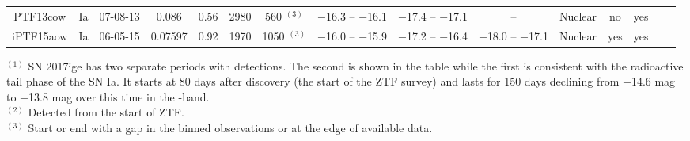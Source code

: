 \documentclass[a4paper,oneside,12pt, class=Latex/Classes/PhDthesisPSnPDF, crop=false]{standalone}
\begin{document}
\begin{table}
{\begin{tabular}{ccccc|cccccccccc}
        PTF13cow & Ia & 07-08-13 & 0.086 & 0.56 & 2980 & 560 $^{(3)}$ & $-$16.3 -- $-$16.1 & $-$17.4 -- $-$17.1 & -- & Nuclear& no & yes \\
        iPTF15aow & Ia & 06-05-15 & 0.07597 & 0.92 & 1970 & 1050 $^{(3)}$ & $-$16.0 -- $-$15.9 & $-$17.2 -- $-$16.4 & $-$18.0 -- $-$17.1 & Nuclear& yes & yes \\
        \hline
    \end{tabular}
    }
    \label{weirdos}
    \begin{flushleft}
        $^{(1)}$ SN 2017ige has two separate periods with detections. The second is shown in the table while the first is consistent with the radioactive tail phase of the SN Ia. It starts at 80 days after discovery (the start of the ZTF survey) and lasts for 150 days declining from $-$14.6 mag to $-$13.8 mag over this time in the \ztfg-band. \\
        $^{(2)}$ Detected from the start of ZTF.\\
        $^{(3)}$ Start or end with a gap in the binned observations or at the edge of available data.\\
    \end{flushleft}
\end{table}
\end{document}
